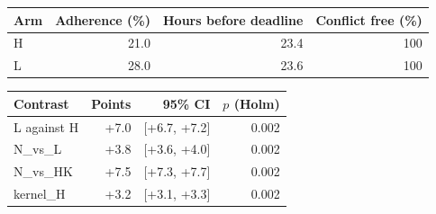 \begin{tabular}{lrrr}
\hline
Arm & Adherence (\%) & Hours before deadline & Conflict free (\%) \\
\hline
H & 21.0 & 23.4 & 100 \\
L & 28.0 & 23.6 & 100 \\
\hline
\end{tabular}

\begin{tabular}{lrrr}
\hline
Contrast & Points & 95\% CI & $p$ (Holm) \\
\hline
L against H & +7.0 & [+6.7, +7.2] & 0.002 \\
N_vs_L & +3.8 & [+3.6, +4.0] & 0.002 \\
N_vs_HK & +7.5 & [+7.3, +7.7] & 0.002 \\
kernel_H & +3.2 & [+3.1, +3.3] & 0.002 \\
\hline
\end{tabular}
